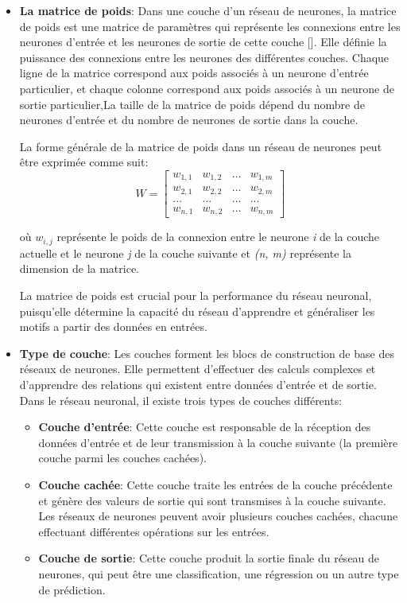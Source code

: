 \begin{itemize}
	\item \textbf{La matrice de poids}: Dans une couche d'un réseau de neurones, la matrice de poids est une matrice de paramètres qui représente les connexions entre les neurones d'entrée et les neurones de sortie de cette couche [\cite{aggarwal_2018}]. Elle définie la puissance des connexions entre les neurones des différentes couches. Chaque ligne de la matrice correspond aux poids associés à un neurone d'entrée particulier, et chaque colonne correspond aux poids associés à un neurone de sortie particulier,La taille de la matrice de poids dépend du nombre de neurones d'entrée et du nombre de neurones de sortie dans la couche.

	      La forme générale de la matrice de poids dans un réseau de neurones peut être
	      exprimée comme suit:
	      \begin{equation}
		      W = \begin{bmatrix}
			      w_{1,1} & w_{1,2} & ... & w_{1, m} \\
			      w_{2,1} & w_{2,2} & ... & w_{2, m} \\
			      ...     & ...     & ... & ...      \\
			      w_{n,1} & w_{n,2} & ... & w_{n, m}
		      \end{bmatrix}
	      \end{equation}

	      où $w_{i,j}$ représente le poids de la connexion entre le neurone \textit{i} de
	      la couche actuelle et le neurone \textit{j} de la couche suivante et
	      \textit{(n, m)} représente la dimension de la matrice.

	      La matrice de poids est crucial pour la performance du réseau neuronal,
	      puisqu'elle détermine la capacité du réseau d'apprendre et généraliser les
	      motifs a partir des données en entrées.

	\item \textbf{Type de couche}: Les couches forment les blocs de construction de base des réseaux de neurones. Elle permettent d'effectuer des calculs complexes et d'apprendre des relations qui existent entre données d'entrée et de sortie. Dans le réseau neuronal, il existe trois types de couches différents:
	      \begin{itemize}
		      \item \textbf{Couche d'entrée}: Cette couche est responsable de la réception des données d'entrée et de leur transmission à la couche suivante (la première couche parmi les couches cachées).
		      \item \textbf{Couche cachée}: Cette couche traite les entrées de la couche précédente et génère des valeurs de sortie qui sont transmises à la couche suivante. Les réseaux de neurones peuvent avoir plusieurs couches cachées, chacune effectuant différentes opérations sur les entrées.
		      \item \textbf{Couche de sortie}: Cette couche produit la sortie finale du réseau de neurones, qui peut être une classification, une régression ou un autre type de prédiction.
	      \end{itemize}
\end{itemize}


